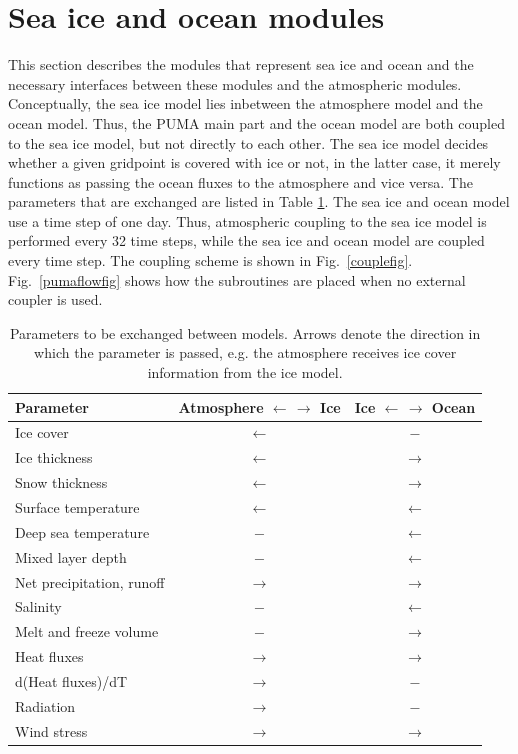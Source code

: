 
\clearpage
\section{Sea ice and ocean modules}
This section describes the modules that represent sea ice and ocean and
the necessary interfaces between these modules and the atmospheric modules.
Conceptually, the sea ice model lies inbetween the atmosphere model and
the ocean model.
Thus, the PUMA main part and the ocean model are both coupled to the
sea ice model, but not directly to each other.
The sea ice model decides whether a given gridpoint is covered with ice
or not, in the latter case, it merely functions as passing the ocean
fluxes to the atmosphere and vice versa.
The parameters that are exchanged are listed in Table \ref{eiscpltab}.
The sea ice and ocean model use a time step of one day.
Thus, atmospheric coupling to the sea ice model is performed
every 32 time steps, while the sea ice and ocean model are
coupled every time step.
The coupling scheme is shown in Fig.\ \ref{couplefig}. Fig.\ \ref{pumaflowfig}
shows how the subroutines are placed when no external coupler is used.

\begin{table}[h]
\begin{tabular}{lcc}
\hline
Parameter & Atmosphere $\leftarrow \, \rightarrow$ Ice
& Ice $\leftarrow \, \rightarrow$ Ocean \\
\hline
Ice cover 		& $\leftarrow$ 	& $-$ \\
Ice thickness 		& $\leftarrow$ 	& $\rightarrow$ \\
Snow thickness		& $\leftarrow$ 	& $\rightarrow$ \\
Surface temperature	& $\leftarrow$ 	& $\leftarrow$ \\
Deep sea temperature	& $-$      	& $\leftarrow$ \\
Mixed layer depth	& $-$ 		& $\leftarrow$ \\
Net precipitation, runoff  & $\rightarrow$	& $\rightarrow$ \\
Salinity                & $-$ 		& $\leftarrow$ \\
Melt and freeze volume  & $-$ 		& $\rightarrow$ \\
Heat fluxes		& $\rightarrow$	& $\rightarrow$ \\
d(Heat fluxes)/dT	& $\rightarrow$	& $-$ \\
Radiation       	& $\rightarrow$	& $-$ \\
Wind stress		& $\rightarrow$	& $\rightarrow$ \\
\hline
\end{tabular}
\caption[]{Parameters to be exchanged between models.
Arrows denote the direction in which the parameter is passed,
e.g. the atmosphere receives ice cover information from the ice model.}
\label{eiscpltab}
\end{table}

